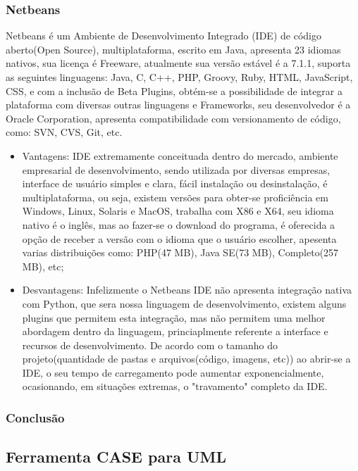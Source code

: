 \documentclass[12pt,a4paper]{article}
\begin{document}
		\subsubsection{Netbeans}
			Netbeans é um Ambiente de Desenvolvimento Integrado (IDE) de código aberto(Open Source), multiplataforma, escrito em
			Java, apresenta 23 idiomas nativos, sua licença é Freeware, atualmente sua versão estável é a 7.1.1, suporta as
			seguintes linguagens: Java, C, C++, PHP, Groovy, Ruby, HTML, JavaScript, CSS, e com a inclusão de Beta Plugins,
			obtém-se a possibilidade de integrar a plataforma com diversas outras linguagens e Frameworks, seu desenvolvedor é a
			Oracle Corporation, apresenta compatibilidade com versionamento de código, como: SVN, CVS, Git, etc.
		
			\begin{itemize}
				\item Vantagens:
				IDE extremamente conceituada dentro do mercado, ambiente empresarial de desenvolvimento, sendo utilizada por diversas empresas, interface de usuário simples e clara, fácil instalação ou desinstalação, é multiplataforma, ou seja, existem versões para obter-se proficiência em Windows, Linux, Solaris e MacOS, trabalha com X86 e X64, seu idioma nativo é o inglês, mas ao fazer-se o download do programa, é oferecida a opção de receber a versão com o idioma que o usuário escolher, apesenta varias distribuições como: PHP(47 MB), Java SE(73 MB), Completo(257 MB), etc;
				\item Desvantagens:
				 Infelizmente o Netbeans IDE não apresenta integração nativa com Python, que sera nossa linguagem de desenvolvimento, existem alguns plugins que permitem esta integração, mas não permitem uma melhor abordagem dentro da linguagem, princiaplmente referente a interface e recursos de desenvolvimento. 
				 De acordo com o tamanho do projeto(quantidade de pastas e arquivos(código, imagens, etc)) ao abrir-se a IDE, o seu tempo de carregamento pode aumentar exponencialmente, ocasionando, em situações extremas, o "travamento" completo da IDE.
			\end{itemize}
		
		\subsubsection{Conclusão}

	\clearpage
	\subsection{Ferramenta CASE para UML}
\end{document}
